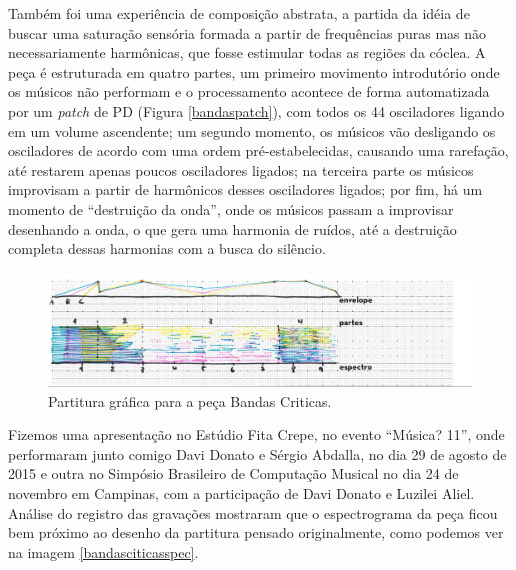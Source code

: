 Também foi uma experiência de composição abstrata, a partida da idéia de buscar uma saturação sensória formada a partir de frequências puras mas não necessariamente harmônicas, que fosse estimular todas as regiões da cóclea. A peça é estruturada em quatro partes, um primeiro movimento introdutório onde os músicos não performam e o processamento acontece de forma automatizada por um \emph{patch} de PD (Figura \ref{bandaspatch}), com todos os 44 osciladores ligando em um volume ascendente; um segundo momento, os músicos vão desligando os osciladores de acordo com uma ordem pré-estabelecidas, causando uma rarefação, até restarem apenas poucos osciladores ligados; na terceira parte os músicos improvisam a partir de harmônicos desses osciladores ligados; por fim, há um momento de ``destruição da onda'', onde os músicos passam a improvisar desenhando a onda, o que gera uma harmonia de ruídos, até a destruição completa dessas harmonias com a busca do silêncio.

\begin{figure}[htb]
    \caption{\label{bandaspartitura}Partitura gráfica para a peça Bandas Criticas. }
    \begin{center}
    \includegraphics[width=1\linewidth]{pictures/cap3/bandascriticaspartitura}
    \end{center}
\end{figure}

Fizemos uma apresentação no Estúdio Fita Crepe, no evento ``Música? 11'', onde performaram junto comigo Davi Donato e Sérgio Abdalla, no dia 29 de agosto de 2015 e outra no Simpósio Brasileiro de Computação Musical no dia 24 de novembro em Campinas, com a participação de Davi Donato e Luzilei Aliel. Análise do registro das gravações mostraram que o espectrograma da peça ficou bem próximo ao desenho da partitura pensado originalmente, como podemos ver na imagem \ref{bandasciticasspec}. 

